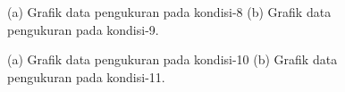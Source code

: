 \begin{figure}[H]
	\begin{subfigure}{0.49\textwidth}
		\centering
		\caption{}
		\label{fig:condition_8}
	\end{subfigure}
	\centering
	\begin{subfigure}{0.49\textwidth}
		\centering
		\caption{}
		\label{fig:condition_9}
	\end{subfigure}
	\caption{(a) Grafik data pengukuran pada kondisi-8 (b) Grafik data pengukuran pada kondisi-9.}
\end{figure}

\begin{figure}[H]
	\begin{subfigure}{0.49\textwidth}
		\centering
		\caption{}
		\label{fig:condition_10}
	\end{subfigure}
	\centering
	\begin{subfigure}{0.49\textwidth}
		\centering
		\caption{}
		\label{fig:condition_11}
	\end{subfigure}
	\caption{(a) Grafik data pengukuran pada kondisi-10 (b) Grafik data pengukuran pada kondisi-11.}
\end{figure}

